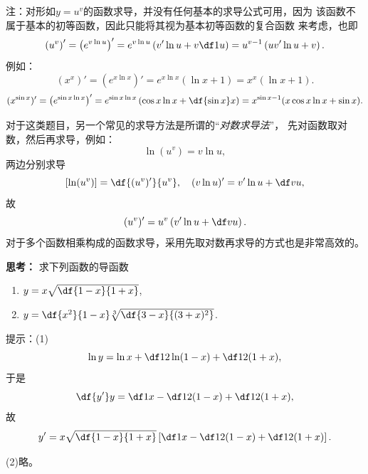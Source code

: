 注：对形如$y=u^v$的函数求导，并没有任何基本的求导公式可用，因为
该函数不属于基本的初等函数，因此只能将其视为基本初等函数的复合函数
来考虑，也即
$$\left(u^v\right)'=\left(e^{v\ln u}\right)'
=e^{v\ln u}\left(v'\ln u+v\df1u\right)
=u^{v-1}\left(uv'\ln u+v\right).$$
例如：
$$(x^x)'=\left(e^{x\ln x}\right)'
=e^{x\ln x}\left(\ln x+1\right)=x^x(\ln x+1).$$
$$(x^{\sin x})'=\left(e^{\sin x\ln x}\right)'
=e^{\sin x\ln x}\left(\cos x\ln x+\df{\sin x}x\right)
=x^{\sin x-1}(x\cos x\ln x+\sin x).$$

对于这类题目，另一个常见的求导方法是所谓的“{\it 对数求导法}”，
先对函数取对数，然后再求导，例如：
$$\ln(u^v)=v\ln u,$$
两边分别求导
$$[\ln(u^v)]=\df{(u^v)'}{u^v},
\quad (v\ln u)'=v'\ln u+\df vu,$$
故
$$(u^v)'=u^v\left(v'\ln u+\df vu\right).$$
对于多个函数相乘构成的函数求导，采用先取对数再求导的方式也是非常高效的。

{\bf 思考：} 求下列函数的导函数
\begin{enumerate}[(1)]
  \setlength{\itemindent}{1cm}
  \item $y=x\sqrt{\df{1-x}{1+x}}$,
  \item $y=\df{x^2}{1-x}\sqrt[3]{\df{3-x}{(3+x)^2}}$. 
\end{enumerate}

\ifhint
提示：(1)
$$\ln y=\ln x+\df12\ln(1-x)+\df12(1+x),$$
于是
$$\df{y'}y=\df1x-\df1{2(1-x)}+\df1{2(1+x)},$$
故
$$y'=x\sqrt{\df{1-x}{1+x}}
\left[\df1x-\df1{2(1-x)}+\df1{2(1+x)}\right].$$

(2)略。
\fi

